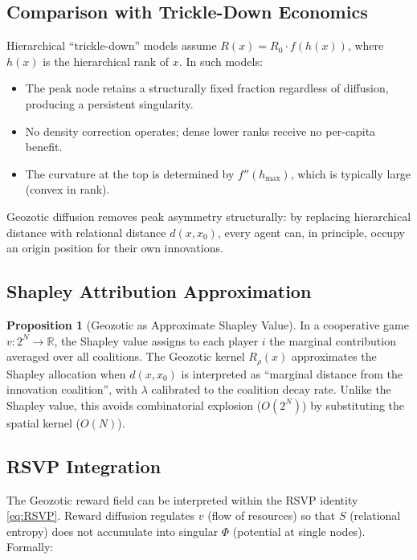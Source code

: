 \documentclass[12pt,a4paper]{article}
\theoremstyle{definition}
\newtheorem{proposition}{Proposition}[section]
\begin{document}
\subsection{Comparison with Trickle-Down Economics}

Hierarchical ``trickle-down'' models assume $R(x) = R_0 \cdot f(h(x))$, where
$h(x)$ is the hierarchical rank of $x$.  In such models:

\begin{itemize}[leftmargin=*]
  \item The peak node retains a structurally fixed fraction regardless of
    diffusion, producing a persistent singularity.
  \item No density correction operates; dense lower ranks receive no
    per-capita benefit.
  \item The curvature at the top is determined by $f''(h_{\max})$, which is
    typically large (convex in rank).
\end{itemize}

Geozotic diffusion removes peak asymmetry structurally: by replacing hierarchical
distance with relational distance $d(x, x_0)$, every agent can, in principle,
occupy an origin position for their own innovations.

\subsection{Shapley Attribution Approximation}

\begin{proposition}[Geozotic as Approximate Shapley Value]
  In a cooperative game $v : 2^N \to \mathbb{R}$, the Shapley value assigns
  to each player $i$ the marginal contribution averaged over all coalitions.
  The Geozotic kernel $R_\rho(x)$ approximates the Shapley allocation when
  $d(x, x_0)$ is interpreted as ``marginal distance from the innovation
  coalition'', with $\lambda$ calibrated to the coalition decay rate.
  Unlike the Shapley value, this avoids combinatorial explosion ($O(2^N)$)
  by substituting the spatial kernel ($O(N)$).
\end{proposition}

\subsection{RSVP Integration}

The Geozotic reward field can be interpreted within the RSVP identity
\eqref{eq:RSVP}.  Reward diffusion regulates $v$ (flow of resources) so
that $S$ (relational entropy) does not accumulate into singular $\Phi$
(potential at single nodes).  Formally:
\end{document}
